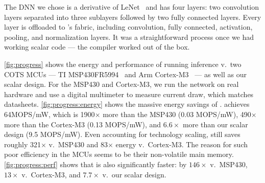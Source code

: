 The DNN we chose is a derivative of LeNet~\cite{lecun:ieee89:lenet} and has four layers: two convolution layers separated into three sublayers followed by two fully connected layers.
% 
Every layer is offloaded to \riptide's fabric, including convolution, fully connected, activation, pooling, and normalization layers.
% 
It was a straightforward process once we had working scalar code ---
% 
the compiler worked out of the box.

\autoref{fig:progress} shows the energy and performance of \riptide running inference v.\ two COTS MCUs --- TI MSP430FR5994~\cite{msp430fr5994} and Arm Cortex-M3~\cite{stm32l1} --- as well as our scalar design.
%
For the MSP430 and Cortex-M3, we run the network on real hardware and use a digital multimeter to measure current draw,
which matches datasheets.
% 
\autoref{fig:progress:energy} shows the massive energy savings of \riptide.
% 
\riptide achieves 64MOPS/mW, which is 1900$\times$ more than the MSP430 (0.03 MOPS/mW), 490$\times$ more than the Cortex-M3 (0.13 MOPS/mW), and $6.6\times$ more  than our scalar design (9.5 MOPS/mW).
% 
Even accounting for technology scaling, \riptide still saves roughly 321$\times$ v.\ MSP430 and 83$\times$ energy v.\ Cortex-M3.
%
The reason for such poor efficiency in the MCUs seems to be their non-volatile main memory.
%
\autoref{fig:progress:perf} shows that \riptide is also significantly faster: by $146\times$ v.\ MSP430, $13\times$ v.\ Cortex-M3, and $7.7\times$ v.\ our scalar design.

\figRipTideProgress
